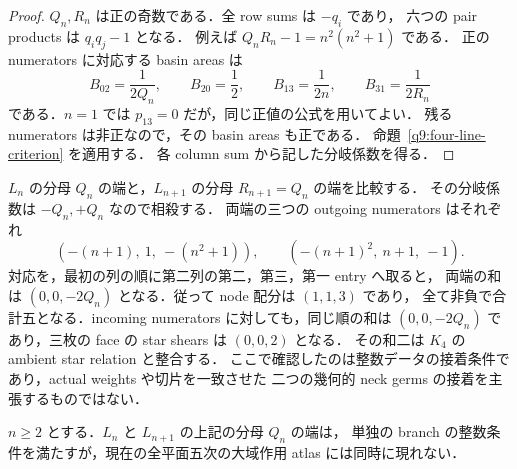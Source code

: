 \begin{proof}
$Q_n,R_n$ は正の奇数である．全 row sums は $-q_i$ であり，
六つの pair products は $q_iq_j-1$ となる．
例えば $Q_nR_n-1=n^2(n^2+1)$ である．
正の numerators に対応する basin areas は
\[
 B_{02}=\frac1{2Q_n},\qquad B_{20}=\frac12,
 \qquad B_{13}=\frac1{2n},\qquad B_{31}=\frac1{2R_n}
\]
である．$n=1$ では $p_{13}=0$ だが，同じ正値の公式を用いてよい．
残る numerators は非正なので，その basin areas も正である．
命題~\ref{q9:four-line-criterion} を適用する．
各 column sum から記した分岐係数を得る．
\end{proof}

$L_n$ の分母 $Q_n$ の端と，$L_{n+1}$ の分母 $R_{n+1}=Q_n$ の端を比較する．
その分岐係数は $-Q_n,+Q_n$ なので相殺する．
両端の三つの outgoing numerators はそれぞれ
\[
 (-(n+1),\ 1,\ -(n^2+1)),
 \qquad (-(n+1)^2,\ n+1,\ -1).
\]
対応を，最初の列の順に第二列の第二，第三，第一 entry へ取ると，
両端の和は $(0,0,-2Q_n)$ となる．従って node 配分は $(1,1,3)$ であり，
全て非負で合計五となる．incoming numerators に対しても，同じ順の和は
$(0,0,-2Q_n)$ であり，三枚の face の star shears は $(0,0,2)$ となる．
その和二は $K_4$ の ambient star relation と整合する．
ここで確認したのは整数データの接着条件であり，actual weights や切片を一致させた
二つの幾何的 neck germs の接着を主張するものではない．

\begin{theorem}[この無限族の隣接端は三角形へ延長しない]\label{qt10:ladder-no-triangle}
$n\ge2$ とする．$L_n$ と $L_{n+1}$ の上記の分母 $Q_n$ の端は，
単独の branch の整数条件を満たすが，現在の全平面五次の大域作用 atlas には同時に現れない．
\end{theorem}

